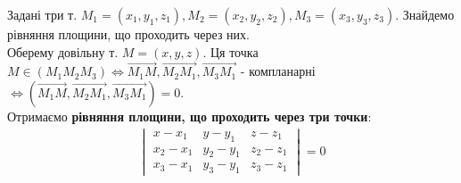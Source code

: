 \documentclass[a4paper, 10pt]{extarticle}
\theoremstyle{theoremdd}
\theoremstyle{theoremdd}
\theoremstyle{theoremdd}
\theoremstyle{theoremdd}
\theoremstyle{theoremdd}
\theoremstyle{theoremdd}
\theoremstyle{theoremdd}
\theoremstyle{theoremdd}
\begin{document}
Задані три т. $M_1 = (x_1,y_1,z_1), M_2 = (x_2,y_2,z_2), M_3 = (x_3,y_3,z_3)$. Знайдемо рівняння площини, що проходить через них.\\
Оберему довільну т. $M = (x,y,z)$. Ця точка $M \in (M_1 M_2 M_3) \iff \overrightarrow{M_1M}, \overrightarrow{M_2M_1}, \overrightarrow{M_3M_1}$ - компланарні $\iff (\overrightarrow{M_1M}, \overrightarrow{M_2M_1}, \overrightarrow{M_3M_1}) = 0$.\\
Отримаємо \textbf{рівняння площини, що проходить через три точки}:
\begin{align*}
\begin{vmatrix}
x-x_1 & y-y_1 & z-z_1 \\
x_2-x_1 & y_2-y_1 & z_2-z_1 \\
x_3-x_1 & y_3-y_1 & z_3-z_1
\end{vmatrix} = 0
\end{align*}

\begin{figure}[H]
\centering
{}
\end{figure}
\end{document}

